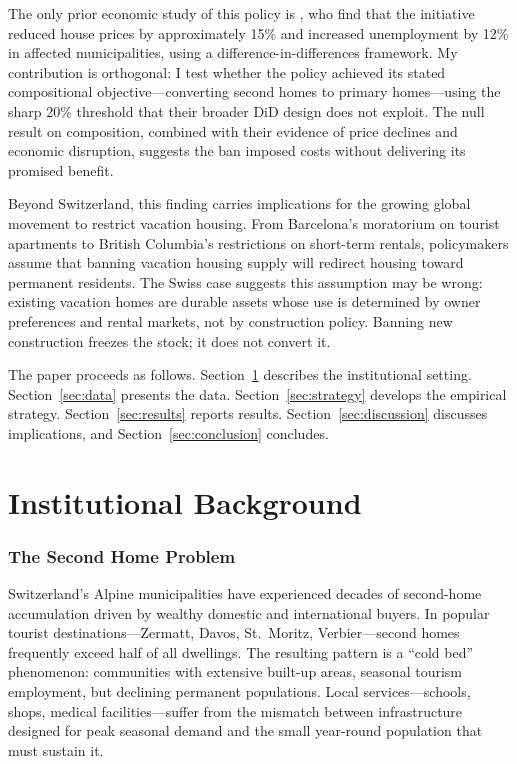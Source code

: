 \documentclass[12pt]{article}
\begin{document}
The only prior economic study of this policy is \citet{hilber2020}, who find that the initiative reduced house prices by approximately 15\% and increased unemployment by 12\% in affected municipalities, using a difference-in-differences framework. My contribution is orthogonal: I test whether the policy achieved its stated compositional objective---converting second homes to primary homes---using the sharp 20\% threshold that their broader DiD design does not exploit. The null result on composition, combined with their evidence of price declines and economic disruption, suggests the ban imposed costs without delivering its promised benefit.

Beyond Switzerland, this finding carries implications for the growing global movement to restrict vacation housing. From Barcelona's moratorium on tourist apartments to British Columbia's restrictions on short-term rentals, policymakers assume that banning vacation housing supply will redirect housing toward permanent residents. The Swiss case suggests this assumption may be wrong: existing vacation homes are durable assets whose use is determined by owner preferences and rental markets, not by construction policy. Banning new construction freezes the stock; it does not convert it.

The paper proceeds as follows. Section~\ref{sec:background} describes the institutional setting. Section~\ref{sec:data} presents the data. Section~\ref{sec:strategy} develops the empirical strategy. Section~\ref{sec:results} reports results. Section~\ref{sec:discussion} discusses implications, and Section~\ref{sec:conclusion} concludes.

\section{Institutional Background}
\label{sec:background}

\subsubsection*{The Second Home Problem} Switzerland's Alpine municipalities have experienced decades of second-home accumulation driven by wealthy domestic and international buyers. In popular tourist destinations---Zermatt, Davos, St.\ Moritz, Verbier---second homes frequently exceed half of all dwellings. The resulting pattern is a ``cold bed'' phenomenon: communities with extensive built-up areas, seasonal tourism employment, but declining permanent populations. Local services---schools, shops, medical facilities---suffer from the mismatch between infrastructure designed for peak seasonal demand and the small year-round population that must sustain it.
\end{document}
